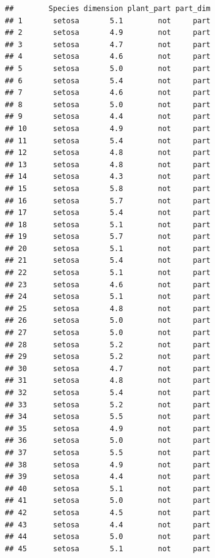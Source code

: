 \documentclass[krantz2]{krantz}\usepackage{knitr}%
\begin{document}
\begin{knitrout}\footnotesize
{}\color{fgcolor}\begin{kframe}
\begin{alltt}
 \hlopt{-}
\end{alltt}
\begin{verbatim}
##        Species dimension plant_part part_dim
## 1       setosa       5.1        not     part
## 2       setosa       4.9        not     part
## 3       setosa       4.7        not     part
## 4       setosa       4.6        not     part
## 5       setosa       5.0        not     part
## 6       setosa       5.4        not     part
## 7       setosa       4.6        not     part
## 8       setosa       5.0        not     part
## 9       setosa       4.4        not     part
## 10      setosa       4.9        not     part
## 11      setosa       5.4        not     part
## 12      setosa       4.8        not     part
## 13      setosa       4.8        not     part
## 14      setosa       4.3        not     part
## 15      setosa       5.8        not     part
## 16      setosa       5.7        not     part
## 17      setosa       5.4        not     part
## 18      setosa       5.1        not     part
## 19      setosa       5.7        not     part
## 20      setosa       5.1        not     part
## 21      setosa       5.4        not     part
## 22      setosa       5.1        not     part
## 23      setosa       4.6        not     part
## 24      setosa       5.1        not     part
## 25      setosa       4.8        not     part
## 26      setosa       5.0        not     part
## 27      setosa       5.0        not     part
## 28      setosa       5.2        not     part
## 29      setosa       5.2        not     part
## 30      setosa       4.7        not     part
## 31      setosa       4.8        not     part
## 32      setosa       5.4        not     part
## 33      setosa       5.2        not     part
## 34      setosa       5.5        not     part
## 35      setosa       4.9        not     part
## 36      setosa       5.0        not     part
## 37      setosa       5.5        not     part
## 38      setosa       4.9        not     part
## 39      setosa       4.4        not     part
## 40      setosa       5.1        not     part
## 41      setosa       5.0        not     part
## 42      setosa       4.5        not     part
## 43      setosa       4.4        not     part
## 44      setosa       5.0        not     part
## 45      setosa       5.1        not     part

\end{verbatim}
\end{kframe}
\end{knitrout}
\end{document}
